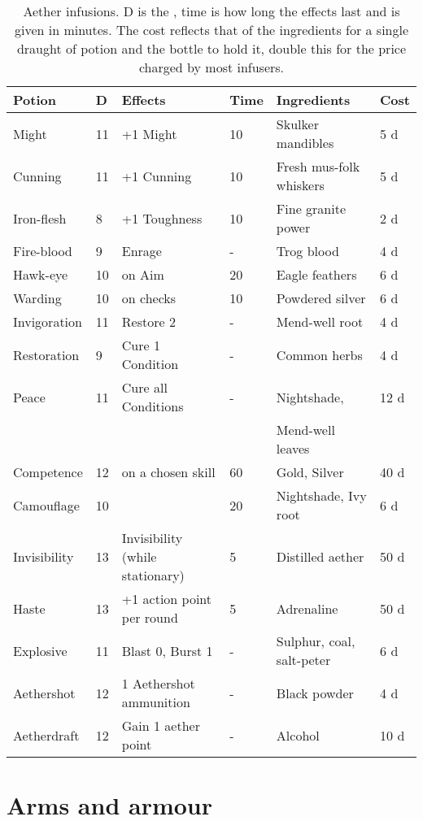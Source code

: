 \documentclass[a4paper,11pt,oneside]{book}
\newcommand{\textlf}[1]{\textbf{\titlecap{#1}}}
\begin{document}
\begin{table}[ht!]
\caption{Aether infusions. D is the \textlf{difficulty}, time is how long the effects last and is given in minutes. The cost reflects that of the ingredients for a single draught of potion and the bottle to hold it, double this for the price charged by most infusers.}
\begin{tabular}{|l|l|l|l|l|l|}
\hline
Potion & D & Effects & Time & Ingredients & Cost \\
\hline
Might &  11 & +1 Might & 10 & Skulker mandibles & 5 d \\
Cunning & 11 & +1 Cunning & 10 & Fresh mus-folk whiskers & 5 d \\
Iron-flesh & 8 & +1 Toughness & 10 & Fine granite power & 2 d \\
Fire-blood & 9 & Enrage & - & Trog blood & 4 d \\
Hawk-eye & 10 & \textlf{edge+} on Aim & 20 & Eagle feathers & 6 d \\
Warding & 10 & \textlf{edge+} on \textlf{resist} checks & 10 & Powdered silver & 6 d \\ 
Invigoration & 11 & Restore 2 \textlf{endurance} & - & Mend-well root & 4 d \\
Restoration & 9 & Cure 1 Condition & - & Common herbs & 4 d \\
Peace & 11 & Cure all Conditions & - & Nightshade,  & 12 d \\
 & & & & Mend-well leaves & \\
Competence & 12 & \textlf{edge+} on a chosen skill & 60 & Gold, Silver & 40 d \\
Camouflage & 10 & \textlf{Stealth edge+} & 20 & Nightshade, Ivy root & 6 d \\
Invisibility & 13 & Invisibility (while stationary) & 5 & Distilled aether & 50 d \\
Haste & 13 & +1 action point per round & 5 & Adrenaline & 50 d \\ 
Explosive & 11 & Blast 0, Burst 1 & - & Sulphur, coal, salt-peter & 6 d \\
Aethershot & 12 & 1 Aethershot ammunition & - & Black powder & 4 d \\
Aetherdraft & 12 & Gain 1 aether point & - & Alcohol & 10 d \\ 
\hline
\end{tabular}
\label{tab:alch}
\end{table}




\chapter{Arms and armour}
\label{chap:arms}
\end{document}
